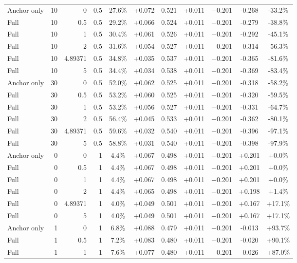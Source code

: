 \begin{table}[htbp]
\begin{tabular}{lrrrccccccc}
Anchor only & 10 & 0 & 0.5 & 27.6\% & +0.072 & 0.521 & +0.011 & +0.201 & -0.268 & -33.2\% \\
Full & 10 & 0.5 & 0.5 & 29.2\% & +0.066 & 0.524 & +0.011 & +0.201 & -0.279 & -38.8\% \\
Full & 10 & 1 & 0.5 & 30.4\% & +0.061 & 0.526 & +0.011 & +0.201 & -0.292 & -45.1\% \\
Full & 10 & 2 & 0.5 & 31.6\% & +0.054 & 0.527 & +0.011 & +0.201 & -0.314 & -56.3\% \\
Full & 10 & 4.89371 & 0.5 & 34.8\% & +0.035 & 0.537 & +0.011 & +0.201 & -0.365 & -81.6\% \\
Full & 10 & 5 & 0.5 & 34.4\% & +0.034 & 0.538 & +0.011 & +0.201 & -0.369 & -83.4\% \\
Anchor only & 30 & 0 & 0.5 & 52.0\% & +0.062 & 0.525 & +0.011 & +0.201 & -0.318 & -58.2\% \\
Full & 30 & 0.5 & 0.5 & 53.2\% & +0.060 & 0.525 & +0.011 & +0.201 & -0.320 & -59.5\% \\
Full & 30 & 1 & 0.5 & 53.2\% & +0.056 & 0.527 & +0.011 & +0.201 & -0.331 & -64.7\% \\
Full & 30 & 2 & 0.5 & 56.4\% & +0.045 & 0.533 & +0.011 & +0.201 & -0.362 & -80.1\% \\
Full & 30 & 4.89371 & 0.5 & 59.6\% & +0.032 & 0.540 & +0.011 & +0.201 & -0.396 & -97.1\% \\
Full & 30 & 5 & 0.5 & 58.8\% & +0.031 & 0.540 & +0.011 & +0.201 & -0.398 & -97.9\% \\
Anchor only & 0 & 0 & 1 & 4.4\% & +0.067 & 0.498 & +0.011 & +0.201 & +0.201 & +0.0\% \\
Full & 0 & 0.5 & 1 & 4.4\% & +0.067 & 0.498 & +0.011 & +0.201 & +0.201 & +0.0\% \\
Full & 0 & 1 & 1 & 4.4\% & +0.067 & 0.498 & +0.011 & +0.201 & +0.201 & +0.0\% \\
Full & 0 & 2 & 1 & 4.4\% & +0.065 & 0.498 & +0.011 & +0.201 & +0.198 & +1.4\% \\
Full & 0 & 4.89371 & 1 & 4.0\% & +0.049 & 0.501 & +0.011 & +0.201 & +0.167 & +17.1\% \\
Full & 0 & 5 & 1 & 4.0\% & +0.049 & 0.501 & +0.011 & +0.201 & +0.167 & +17.1\% \\
Anchor only & 1 & 0 & 1 & 6.8\% & +0.088 & 0.479 & +0.011 & +0.201 & -0.013 & +93.7\% \\
Full & 1 & 0.5 & 1 & 7.2\% & +0.083 & 0.480 & +0.011 & +0.201 & -0.020 & +90.1\% \\
Full & 1 & 1 & 1 & 7.6\% & +0.077 & 0.480 & +0.011 & +0.201 & -0.026 & +87.0\% \\

\end{tabular}
\end{table}
